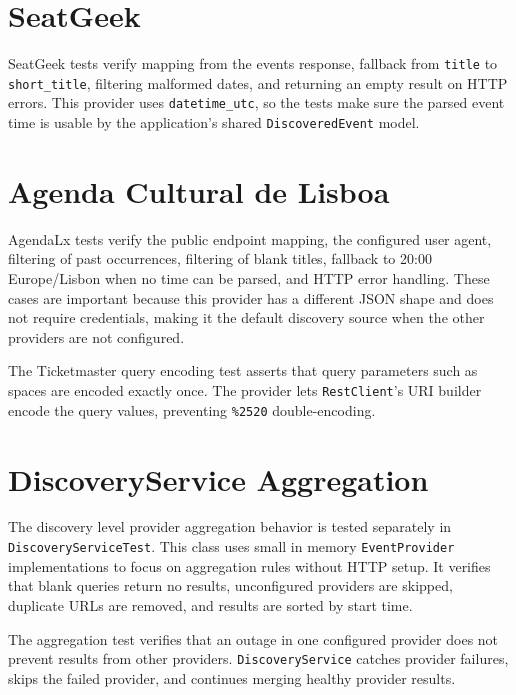 \section{SeatGeek}

SeatGeek tests verify mapping from the events response, fallback from \texttt{title} to \texttt{short\_title}, filtering malformed dates, and returning an empty result on HTTP errors. This provider uses \texttt{datetime\_utc}, so the tests make sure the parsed event time is usable by the application's shared \texttt{DiscoveredEvent} model.

\section{Agenda Cultural de Lisboa}

AgendaLx tests verify the public endpoint mapping, the configured user agent, filtering of past occurrences, filtering of blank titles, fallback to 20:00 Europe/Lisbon when no time can be parsed, and HTTP error handling. These cases are important because this provider has a different JSON shape and does not require credentials, making it the default discovery source when the other providers are not configured.

The Ticketmaster query encoding test asserts that query parameters such as spaces are encoded exactly once. The provider lets \texttt{RestClient}'s URI builder encode the query values, preventing \texttt{\%2520} double-encoding.

\section{DiscoveryService Aggregation}

The discovery level provider aggregation behavior is tested separately in \texttt{DiscoveryServiceTest}. This class uses small in memory \texttt{EventProvider} implementations to focus on aggregation rules without HTTP setup. It verifies that blank queries return no results, unconfigured providers are skipped, duplicate URLs are removed, and results are sorted by start time.

The aggregation test verifies that an outage in one configured provider does not prevent results from other providers. \texttt{DiscoveryService} catches provider failures, skips the failed provider, and continues merging healthy provider results.
